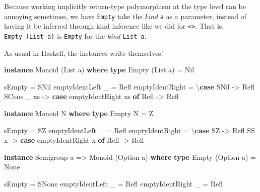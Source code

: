 \documentclass[]{article}
\newenvironment{Shaded}{}{}
\newcommand{\DataTypeTok}[1]{\textcolor[rgb]{0.56,0.13,0.00}{#1}}
\newcommand{\KeywordTok}[1]{\textcolor[rgb]{0.00,0.44,0.13}{\textbf{#1}}}
\newcommand{\NormalTok}[1]{#1}
\newcommand{\OtherTok}[1]{\textcolor[rgb]{0.00,0.44,0.13}{#1}}
\begin{document}
Because working implicitly return-type polymorphism at the type level can be
annoying sometimes, we have \texttt{Empty} take the \emph{kind} \texttt{a} as a
parameter, instead of having it be inferred through kind inference like we did
for \texttt{\textless{}\textgreater{}}. That is, \texttt{Empty\ (List\ a)} is
\texttt{Empty} for the \emph{kind} \texttt{List\ a}.

As usual in Haskell, the instances write themselves!

\begin{Shaded}
\begin{Highlighting}[]
\KeywordTok{instance} \DataTypeTok{Monoid}\NormalTok{ (}\DataTypeTok{List}\NormalTok{ a) }\KeywordTok{where}
    \KeywordTok{type} \DataTypeTok{Empty}\NormalTok{ (}\DataTypeTok{List}\NormalTok{ a) }\OtherTok{=} \DataTypeTok{Nil}

\NormalTok{    sEmpty }\OtherTok{=} \DataTypeTok{SNil}
\NormalTok{    emptyIdentLeft \_ }\OtherTok{=} \DataTypeTok{Refl}
\NormalTok{    emptyIdentRight  }\OtherTok{=}\NormalTok{ \textbackslash{}}\KeywordTok{case}
      \DataTypeTok{SNil} \OtherTok{{-}>} \DataTypeTok{Refl}
      \DataTypeTok{SCons}\NormalTok{ \_ xs }\OtherTok{{-}>}
        \KeywordTok{case}\NormalTok{ emptyIdentRight xs }\KeywordTok{of}
          \DataTypeTok{Refl} \OtherTok{{-}>} \DataTypeTok{Refl}

\KeywordTok{instance} \DataTypeTok{Monoid} \DataTypeTok{N} \KeywordTok{where}
    \KeywordTok{type} \DataTypeTok{Empty} \DataTypeTok{N} \OtherTok{=} \DataTypeTok{Z}

\NormalTok{    sEmpty }\OtherTok{=} \DataTypeTok{SZ}
\NormalTok{    emptyIdentLeft \_ }\OtherTok{=} \DataTypeTok{Refl}
\NormalTok{    emptyIdentRight  }\OtherTok{=}\NormalTok{ \textbackslash{}}\KeywordTok{case}
      \DataTypeTok{SZ} \OtherTok{{-}>} \DataTypeTok{Refl}
      \DataTypeTok{SS}\NormalTok{ x }\OtherTok{{-}>} \KeywordTok{case}\NormalTok{ emptyIdentRight x }\KeywordTok{of}
        \DataTypeTok{Refl} \OtherTok{{-}>} \DataTypeTok{Refl}

\KeywordTok{instance} \DataTypeTok{Semigroup}\NormalTok{ a }\OtherTok{=>} \DataTypeTok{Monoid}\NormalTok{ (}\DataTypeTok{Option}\NormalTok{ a) }\KeywordTok{where}
    \KeywordTok{type} \DataTypeTok{Empty}\NormalTok{ (}\DataTypeTok{Option}\NormalTok{ a) }\OtherTok{=} \DataTypeTok{None}

\NormalTok{    sEmpty }\OtherTok{=} \DataTypeTok{SNone}
\NormalTok{    emptyIdentLeft  \_ }\OtherTok{=} \DataTypeTok{Refl}
\NormalTok{    emptyIdentRight \_ }\OtherTok{=} \DataTypeTok{Refl}
\end{Highlighting}
\end{Shaded}
\end{document}
